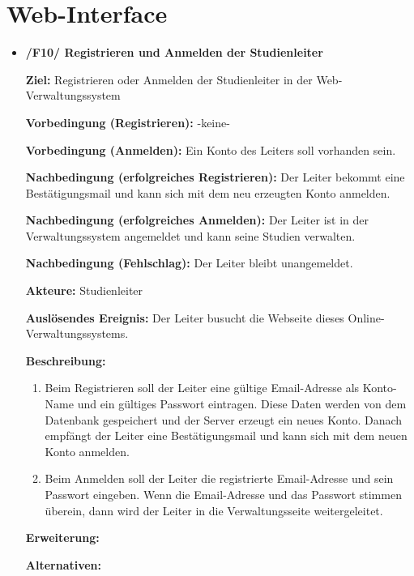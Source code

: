 \documentclass[a4paper]{scrreprt}
\begin{document}
        \section{Web-Interface}
            \begin{itemize}
                \item \textbf{/F10/ Registrieren und Anmelden der Studienleiter}

                    \par \textbf{Ziel: }Registrieren oder Anmelden der \gls{Studienleiter} in der Web-Verwaltungssystem
                    \par \textbf{Vorbedingung (Registrieren): }-keine-
                    \par \textbf{Vorbedingung (Anmelden): }Ein Konto des Leiters soll vorhanden sein.
                    \par \textbf{Nachbedingung (erfolgreiches Registrieren): }Der Leiter bekommt eine Bestätigungsmail und kann sich mit dem neu erzeugten Konto anmelden.
                    \par \textbf{Nachbedingung (erfolgreiches Anmelden): }Der Leiter ist in der Verwaltungssystem angemeldet und kann seine Studien verwalten.
                    \par \textbf{Nachbedingung (Fehlschlag): }Der Leiter bleibt unangemeldet.
                    \par \textbf{Akteure: }\gls{Studienleiter}
                    \par \textbf{Auslösendes Ereignis: }Der Leiter busucht die Webseite dieses Online-Verwaltungssystems.
                    \par \textbf{Beschreibung: }
                        \begin{enumerate}
                            \item Beim Registrieren soll der Leiter eine gültige Email-Adresse als Konto-Name und ein gültiges Passwort eintragen. Diese Daten werden von dem Datenbank gespeichert und der Server erzeugt ein neues Konto. Danach empfängt der Leiter eine Bestätigungsmail und kann sich mit dem neuen Konto anmelden.
                            \item Beim Anmelden soll der Leiter die registrierte Email-Adresse und sein Passwort eingeben. Wenn die Email-Adresse und das Passwort stimmen überein, dann wird der Leiter in die Verwaltungsseite weitergeleitet.
                        \end{enumerate}
                    \par \textbf{Erweiterung: }
                    \par \textbf{Alternativen: }



\end{itemize}
\end{document}
